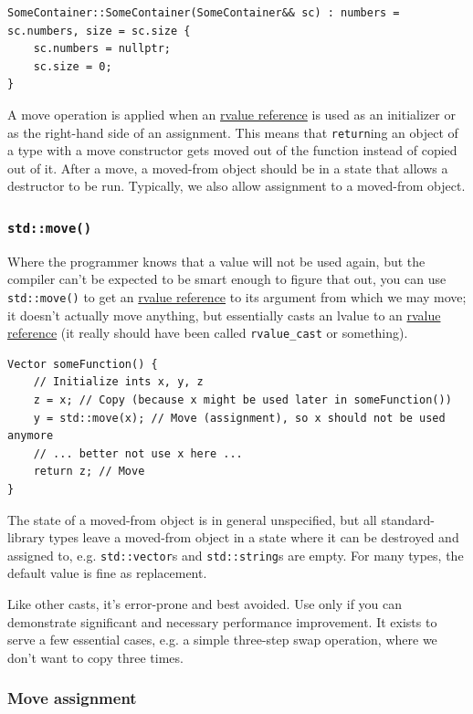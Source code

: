 \documentclass[table, xcdraw]{article}%
\begin{document}
\begin{verbatim}
SomeContainer::SomeContainer(SomeContainer&& sc) : numbers = sc.numbers, size = sc.size {
    sc.numbers = nullptr;
    sc.size = 0;
}
\end{verbatim}

A move operation is applied when an \hyperref[rvaluereference]{rvalue reference} is used as an initializer or as the right-hand side of an assignment. This means that \texttt{return}ing an object of a type with a move constructor gets moved out of the function instead of copied out of it. After a move, a moved-from object should be in a state that allows a destructor to be run.  Typically, we also allow assignment to a moved-from object.

\subsubsection{\texttt{std::move()}}
Where the programmer knows that a value will not be used again, but the compiler can't be expected to be smart enough to figure that out, you can use \texttt{std::move()} to get an \hyperref[rvaluereference]{rvalue reference} to its argument from which we may move; it doesn't actually move anything, but essentially casts an lvalue to an \hyperref[rvaluereference]{rvalue reference} (it really should have been called \texttt{rvalue_cast} or something).

\begin{verbatim}
Vector someFunction() {
    // Initialize ints x, y, z
    z = x; // Copy (because x might be used later in someFunction())
    y = std::move(x); // Move (assignment), so x should not be used anymore
    // ... better not use x here ...
    return z; // Move
}
\end{verbatim}

The state of a moved-from object is in general unspecified, but all standard-library types leave a moved-from object in a state where it can be destroyed and assigned to, e.g. \texttt{std::vector}s and \texttt{std::string}s are empty. For many types, the default value is fine as replacement.

Like other casts, it’s error-prone and best avoided. Use only if you can demonstrate significant and necessary performance improvement. It exists to serve a few essential cases, e.g. a simple three-step swap operation, where we don't want to copy three times.

\subsubsection{Move assignment} \label{moveassignment}
\end{document}
